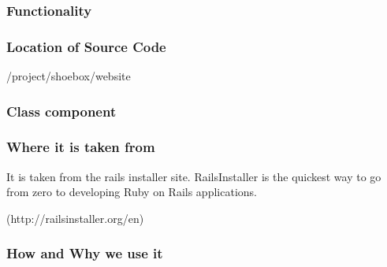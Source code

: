 \documentclass[conference]{IEEEtran}
\begin{document}
\subsubsection{Functionality} 
\subsubsection{Location of Source Code}/project/shoebox/website
\subsubsection{Class component}
\subsubsection{Where it is taken from}It is taken from the rails installer site. RailsInstaller is the quickest way to go from zero to developing Ruby on Rails applications. 

(http://railsinstaller.org/en)
\subsubsection{How and Why we use it}







%
%
\end{document}
